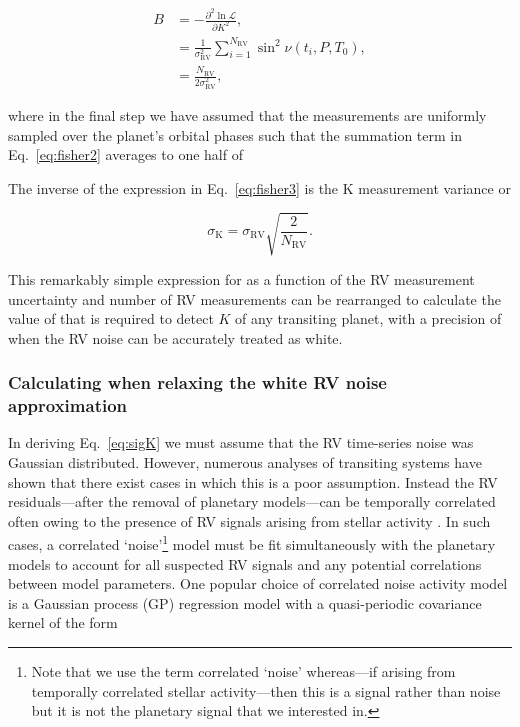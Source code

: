 \begin{align}
  B &= - \frac{\partial^2 \ln{\mathcal{L}}}{\partial K^2}, \\
  &= \frac{1}{\sigma_{\text{RV}}^2} \sum^{N_{\text{RV}}}_{i=1} \sin^2{\nu(t_i,P,T_0)},  \label{eq:fisher2} \\
  &= \frac{N_{\text{RV}}}{2\sigma^2_{\text{RV}}}, \label{eq:fisher3}
\end{align}  

\noindent where in the final step we have assumed 
that the \nrv{} measurements are uniformly sampled
over the planet's orbital phases such that the summation term in Eq.~\ref{eq:fisher2} averages to one
half of 

The inverse of the expression in Eq.~\ref{eq:fisher3} is the K measurement variance or

\begin{equation}
  \sigma_{\text{K}} = \sigma_{\text{RV}} \sqrt{\frac{2}{N_{\text{RV}}}}.
  \label{eq:sigK}
\end{equation}

\noindent This remarkably simple expression for \sigK{} as a function
of the RV measurement uncertainty and number of RV measurements 
can be rearranged to calculate the value of \nrv{} that is
required to detect $K$ of any transiting planet, with a precision of \sigK{,} when the RV noise
can be accurately treated as white.

\subsubsection{Calculating \sigK{} when relaxing the white RV noise approximation} \label{sect:fisherGP}
In deriving Eq.~\ref{eq:sigK} we must assume that the RV time-series noise was Gaussian
distributed. However, numerous analyses of transiting systems have shown that there exist cases in which this is
a poor assumption. Instead the RV residuals---after the removal of planetary models---can be temporally correlated
often owing to the presence of RV signals arising from stellar activity
\citep[e.g.][]{haywood14, grunblatt15, lopezmorales16, cloutier17b, dittmann17}. In
such cases, a correlated `noise'\footnote{Note that we use the term correlated `noise' whereas---if arising
  from temporally correlated stellar activity---then this is a signal rather than noise but it is not the planetary
  signal that we interested in.}
model must be fit simultaneously with the planetary models to account for all suspected
RV signals and any potential correlations between model parameters. One popular choice of
correlated noise activity model is a Gaussian process (GP) regression model with a quasi-periodic covariance kernel
of the form

